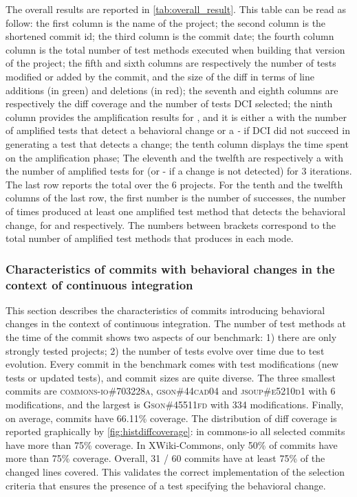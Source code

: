 The overall results are reported in \autoref{tab:overall_result}.
This table can be read as follow:
the first column is the name of the project;
the second column is the shortened commit id;
the third column is the commit date;
the fourth column column is the total number of test methods executed when building that version of the project;
the fifth and sixth columns are respectively the number of tests modified or added by the commit, and the size of the diff in terms of line additions (in green) and deletions (in red);
the seventh and eighth columns are respectively the diff coverage and the number of tests DCI selected;
the ninth column provides the amplification results for \DCIA, and it is either a \cmark with the number of amplified tests that detect a behavioral change or a \textit{-} if DCI did not succeed in generating a test that detects a change;
the tenth column displays the time spent on the amplification phase;
The eleventh and the twelfth are respectively a \cmark with the number of amplified tests for \DCII  (or - if a change is not detected) for 3 iterations.
The last row reports the total over the 6 projects.
For the tenth and the twelfth columns of the last row, the first number is the number of successes, \ie the number of times \DCI produced at least one amplified test method that detects the behavioral change, for  \DCIA and \DCII respectively.
The numbers between brackets correspond to the total number of amplified test methods that \DCI produces in each mode.

\subsubsection{Characteristics of commits with behavioral changes in the context of continuous integration}
\label{subsubsec:dci:evaluation:characteristics}

This section describes the characteristics of commits introducing behavioral changes in the context of continuous integration.
The number of test methods at the time of the commit shows two aspects of our benchmark:
1) there are only strongly tested projects;
2) the number of tests evolve over time due to test evolution.
Every commit in the benchmark comes with test modifications (new tests or updated tests), and commit sizes are quite diverse.
The three smallest commits are \textsc{commons-io\#703228a}, \textsc{gson\#44cad04} and \textsc{jsoup\#e5210d1} with 6 modifications, and the largest is \textsc{Gson\#45511fd} with 334 modifications.
%
Finally, on average, commits have 66.11\% coverage.
The distribution of diff coverage is reported graphically by \autoref{fig:histdiffcoverage}: 
in commons-io all selected commits have more than 75\% coverage.
In XWiki-Commons, only 50\% of commits have more than 75\% coverage. 
Overall, 31 / 60 commits have at least 75\% of the changed lines covered.
This validates the correct implementation of the selection criteria that ensures the presence of a test specifying the behavioral change.

